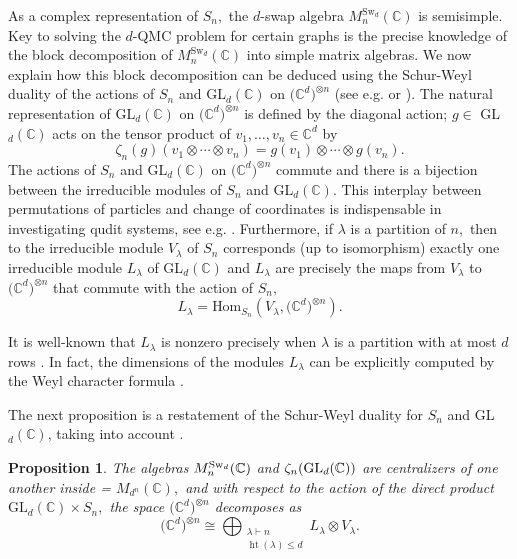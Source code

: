 \documentclass[12pt,dvipsnames,accepted=2016-08-18,a4paper,onecolumn]{quantumarticle}
\DeclareMathOperator{\het}{ht}
\numberwithin{equation}{section}
\newtheorem{proposition}[theorem]{Proposition}
\theoremstyle{definition}
\begin{document}
As a complex representation of $S_n,$ the $d$-swap algebra $M^{\text{Sw}_d}_n(\mathbb{C})$ is semisimple. Key to solving the $d$-QMC problem for certain graphs is the precise knowledge of the block decomposition of  $M^{\text{Sw}_d}_n(\mathbb{C})$ into simple matrix algebras. 
We now explain how this block decomposition 
can be deduced using the Schur-Weyl duality of the actions of $S_n$ and GL$_d(\mathbb{C})$ on $\big(\mathbb{C}^d\big)^{\otimes n}$ (see e.g. \cite[Section 6.1]{FH} or \cite[Section 7.1.2]{Probook}). 
The natural representation of GL$_d(\mathbb{C})$ on $\big(\mathbb{C}^d\big)^{\otimes n}$ is defined by the diagonal action; $g \in $ GL$_d(\mathbb{C})$ acts on the tensor product of $v_1, \ldots,v_n \in \mathbb{C}^d$ by
$$
\zeta_n(g) (v_1 \otimes \cdots \otimes v_n) = g(v_1) \otimes \cdots \otimes g(v_n).
$$
The actions of $S_n$ and GL$_d(\mathbb{C})$ on $\big(\mathbb{C}^d\big)^{\otimes n}$ commute and there is a bijection between the irreducible modules of $S_n$ and GL$_d(\mathbb{C}).$ 
This interplay between permutations of particles and change of coordinates is indispensable in investigating qudit systems, see e.g. \cite{GNW21}.
Furthermore, if $\lambda$ is a partition of $n,$ then to the irreducible module $V_\lambda$ of $S_n$ corresponds (up to isomorphism) exactly one irreducible module $L_\lambda$ of GL$_d(\mathbb{C})$ and $L_\lambda$ are precisely the maps from $V_\lambda$ to $\big(\mathbb{C}^d\big)^{\otimes n}$ that commute with the action of $S_n,$
$$
L_\lambda = \text{Hom}_{S_n}(V_\lambda,\big(\mathbb{C}^d\big)^{\otimes n}).
$$

It is well-known that $L_\lambda$ is nonzero precisely when $\lambda$ is a partition with at most $d$ rows \cite[Proposition 9.3.1]{Probook}. In fact, the dimensions of the modules $L_\lambda$ can be explicitly computed by the Weyl character formula \cite[Section 9.6.2]{Probook}. 
	
	
		
The next proposition is a restatement of the Schur-Weyl duality \cite[Theorem 9.3.1]{Probook} for $S_n$ and GL$_d(\mathbb{C})$, taking into account \cite[Proposition 9.3.1]{Probook}.



\begin{proposition}
	The algebras $M^{\text{\textnormal{Sw}}_d}_n(\mathbb{C})$  and $\zeta_n(\text{\textnormal{GL}}_d(\mathbb{C}))$ are centralizers of one another inside  = $M_{d^n}(\mathbb{C}),$ and with respect to the action of the direct product $\text{GL}_d(\mathbb{C}) \times S_n,$ the space $\big(\mathbb{C}^d\big)^{\otimes n}$ decomposes as
	\begin{equation}\label{eq:decomp}
	    \big(\mathbb{C}^d\big)^{\otimes n} \cong \bigoplus_{\substack{\lambda\vdash n \\[.5mm] \het(\lambda)\le d}} L_\lambda \otimes V_\lambda. 
	\end{equation}
\end{proposition}
\end{document}
